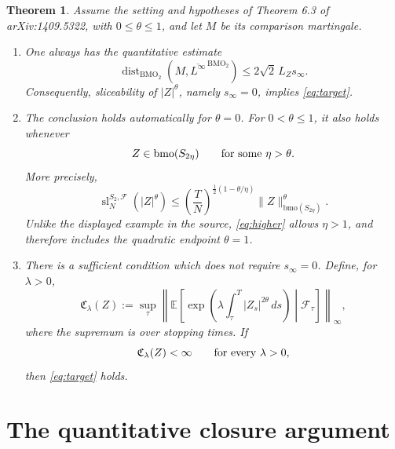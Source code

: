 \documentclass[11pt]{article}
\newtheorem{theorem}{Theorem}
\newcommand{\BMO}{\mathrm{BMO}}
\newcommand{\bmo}{\mathrm{bmo}}
\newcommand{\E}{\mathbb E}
\newcommand{\F}{\mathcal F}
\newcommand{\slc}{\operatorname{sl}}
\newcommand{\dist}{\operatorname{dist}}
\begin{document}
\begin{theorem}\label{thm:main}
Assume the setting and hypotheses of Theorem 6.3 of arXiv:1409.5322, with
\(0\leq\theta\leq1\), and let \(M\) be its comparison martingale.

\begin{enumerate}[label=(\roman*),leftmargin=2.2em]
\item One always has the quantitative estimate
\begin{equation}\label{eq:distance}
 \dist_{\BMO_2}\!\left(M,
       \overline{L^\infty}^{\,\BMO_2}\right)
 \leq 2\sqrt2\,L_Zs_\infty.
\end{equation}
Consequently, sliceability of \(|Z|^\theta\), namely \(s_\infty=0\), implies
\eqref{eq:target}.

\item The conclusion holds automatically for \(\theta=0\). For
\(0<\theta\leq1\), it also holds whenever
\begin{equation}\label{eq:higher}
 Z\in\bmo(S_{2\eta})\qquad\hbox{for some }\eta>\theta.
\end{equation}
More precisely,
\begin{equation}\label{eq:rate}
 \slc_N^{S_2,\F}(|Z|^\theta)
 \leq \left(\frac TN\right)^{\frac12(1-\theta/\eta)}
       \|Z\|_{\bmo(S_{2\eta})}^{\theta}.
\end{equation}
Unlike the displayed example in the source, \eqref{eq:higher} allows
\(\eta>1\), and therefore includes the quadratic endpoint \(\theta=1\).

\item There is a sufficient condition which does not require
\(s_\infty=0\). Define, for \(\lambda>0\),
\begin{equation}\label{eq:energy}
 \mathfrak C_\lambda(Z):=
 \sup_\tau\left\|
 \E\left[
   \exp\!\left(\lambda\int_\tau^T|Z_s|^{2\theta}\,ds\right)
   \middle|\F_\tau\right]\right\|_\infty,
\end{equation}
where the supremum is over stopping times. If
\begin{equation}\label{eq:allrates}
 \mathfrak C_\lambda(Z)<\infty\qquad\hbox{for every }\lambda>0,
\end{equation}
then \eqref{eq:target} holds.
\end{enumerate}
\end{theorem}

\section*{The quantitative closure argument}
\end{document}
